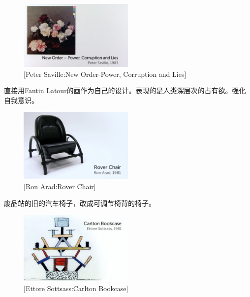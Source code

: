 \documentclass[UTF8]{../RepresentationUniverse}
\begin{document}
\begin{figure}[h]
    \centering
    \includegraphics[width=0.5\textwidth]{./src/figures/New Order-Power, Corruption and Lies_2023-04-09_21-12-41.png}
    \caption{[Peter Saville:New Order-Power, Corruption and Lies]}
    \label{figure:New Order-Power, Corruption and Lies}
\end{figure}
直接用Fantin Latour的画作为自己的设计。表现的是人类深层次的占有欲。强化自我意识。



\begin{figure}[h]
    \centering
    \includegraphics[width=0.5\textwidth]{./src/figures/Rover Chair_2023-04-09_21-16-06.png}
    \caption{[Ron Arad:Rover Chair]}
    \label{figure:Rover Chair}
\end{figure}
废品站的旧的汽车椅子，改成可调节椅背的椅子。




\begin{figure}[h]
    \centering
    \includegraphics[width=0.5\textwidth]{./src/figures/Carlton Bookcase_2023-04-09_21-18-44.png}
    \caption{[Ettore Sottsass:Carlton Bookcase]}
    \label{figure:Carlton Bookcase}
\end{figure}
\end{document}
